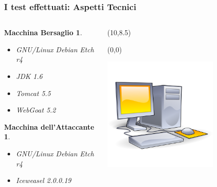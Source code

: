 \documentclass{beamer}
\newtheorem{bersaglio}{Macchina Bersaglio}
\newtheorem{attaccante}{Macchina dell'Attaccante}
\begin{document}
\begin{frame}
  \frametitle{I test effettuati: Aspetti Tecnici}
  
  \begin{columns}   
    \begin{column}{0.5\textwidth}
      \begin{bersaglio}
	\begin{itemize}
	\item GNU/Linux Debian Etch r4
	\item JDK 1.6
	\item Tomcat 5.5 
	\item WebGoat 5.2
	\end{itemize}
      \end{bersaglio}
      
      \begin{attaccante}
	\begin{itemize}
	\item GNU/Linux Debian Etch r4
	\item Iceweasel 2.0.0.19
	\end{itemize}
      \end{attaccante}
    \end{column}
    
    \begin{column}{0.3\textwidth}
      \begin{textblock}{4}(10,8.5)
	\begin{picture}(0,0)
	  \centerline{\includegraphics[width=0.7\textwidth]{images/computer.png}}
	\end{picture}
      \end{textblock} 
      

\end{column}
\end{columns}
\end{frame}
\end{document}
